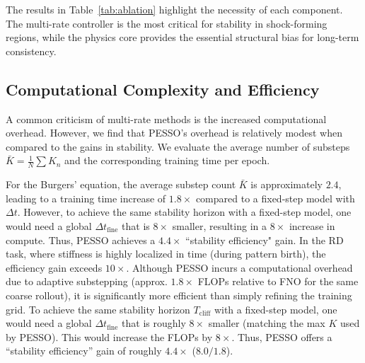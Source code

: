 \documentclass{article}
\theoremstyle{plain}
\theoremstyle{definition}
\theoremstyle{remark}
\begin{document}
\begin{table}[t]
  \centering
  \caption{Ablation study on Burgers and reaction--diffusion. 
  Removing any PESSO component degrades long-horizon stability and reduces $T_\mathrm{cliff}$.}
  \label{tab:ablation}
\end{table}

The results in Table~\ref{tab:ablation} highlight the necessity of each component. The multi-rate controller is the most critical for stability in shock-forming regions, while the physics core provides the essential structural bias for long-term consistency.

\subsection{Computational Complexity and Efficiency}

A common criticism of multi-rate methods is the increased computational overhead. However, we find that PESSO's overhead is relatively modest when compared to the gains in stability. We evaluate the average number of substeps $\bar{K} = \frac{1}{N} \sum K_n$ and the corresponding training time per epoch.

For the Burgers' equation, the average substep count $\bar{K}$ is approximately $2.4$, leading to a training time increase of $1.8\times$ compared to a fixed-step model with $\Delta t$. However, to achieve the same stability horizon with a fixed-step model, one would need a global $\Delta t_{\text{fine}}$ that is $8\times$ smaller, resulting in a $8\times$ increase in compute. Thus, PESSO achieves a $4.4\times$ ``stability efficiency" gain. In the RD task, where stiffness is highly localized in time (during pattern birth), the efficiency gain exceeds $10\times$.
Although PESSO incurs a computational overhead due to adaptive substepping (approx. $1.8\times$ FLOPs relative to FNO for the same coarse rollout), it is significantly more efficient than simply refining the training grid. To achieve the same stability horizon $T_{\text{cliff}}$ with a fixed-step model, one would need a global $\Delta t_{\text{fine}}$ that is roughly $8\times$ smaller (matching the max $K$ used by PESSO). This would increase the FLOPs by $8\times$. Thus, PESSO offers a ``stability efficiency'' gain of roughly $4.4\times$ ($8.0/1.8$).
\end{document}

